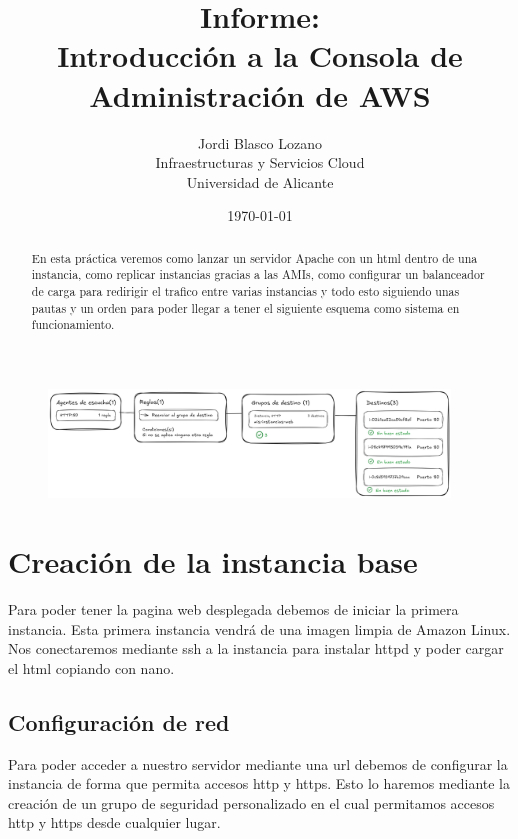 \documentclass{article}
\title{Informe: \\ Introducción a la Consola de Administración de AWS}
\author{
	Jordi Blasco Lozano \\
	\small Infraestructuras y Servicios Cloud \\
	\small Universidad de Alicante
}
\date{\today}
\begin{document}
	
	\maketitle

	\begin{abstract}
	\noindent En esta práctica veremos como lanzar un servidor Apache con un html dentro de una instancia, como replicar instancias gracias a las AMIs, como configurar un balanceador de carga para redirigir el trafico entre varias instancias y todo esto siguiendo unas pautas y un orden para poder llegar a tener el siguiente esquema como sistema en funcionamiento.
	\end{abstract}
	\begin{figure}[H]
	\centering
	\includegraphics[width=0.95\textwidth]{esquema.png}
	\end{figure}


	\tableofcontents

	\newpage

	\section{Creación de la instancia base}

		Para poder tener la pagina web desplegada debemos de iniciar la primera instancia. Esta primera instancia vendrá de una imagen limpia de Amazon Linux. Nos conectaremos mediante ssh a la instancia para instalar httpd y poder cargar el html copiando con nano.

	\subsection{Configuración de red}

		Para poder acceder a nuestro servidor mediante una url debemos de configurar la instancia de forma que permita accesos http y https. Esto lo haremos mediante la creación de un grupo de seguridad personalizado en el cual permitamos accesos http y https desde cualquier lugar.
\end{document}
